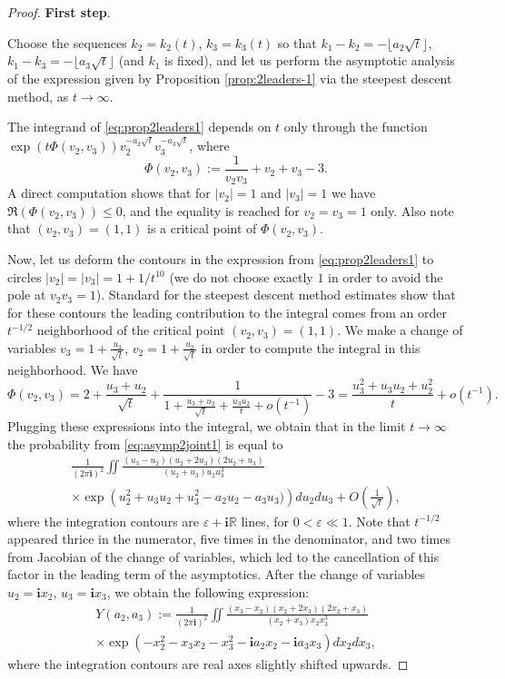 \documentclass[11pt,reqno]{amsart}
\theoremstyle{definition}
\theoremstyle{remark}
\theoremstyle{remark}
\def\leq{\leqslant}
\renewcommand\le{\leq}
\def\R{\mathbb R}
\newcommand{\eps}{\varepsilon}
\newcommand{\ii}{{\mathbf i}}
\numberwithin{equation}{section}
\begin{document}
	\begin{proof}
		
		\textbf{First step}. 
		
		\smallskip
		
		Choose the sequences $k_2 = k_2(t)$, $k_3 = k_3 (t)$ so that $k_1 - k_2 = - \lfloor a_2 \sqrt{t} \rfloor$, $k_1 - k_3 =- \lfloor a_3 \sqrt{t} \rfloor$ (and $k_1$ is fixed), and
		let us perform the asymptotic analysis of the expression given by Proposition \ref{prop:2leaders-1} via the steepest descent method, as $t \to \infty$. 
		
		The integrand of \eqref{eq:prop2leaders1} depends on $t$ only through the function $\exp ( t \Phi (v_2,v_3)) v_2^{-a_2 \sqrt{t}} v_3^{-a_3 \sqrt{t}}$, where
		$$
		\Phi (v_2,v_3) := \frac{1}{v_2 v_3} + v_2 + v_3 - 3.
		$$
		A direct computation shows that for $|v_2|=1$ and $|v_3|=1$ we have $\Re \left( \Phi (v_2,v_3) \right) \le 0$, and the equality is reached for $v_2=v_3=1$ only. Also note that $(v_2,v_3)=(1,1)$ is a critical point of $\Phi (v_2,v_3)$. 
		
		Now, let us deform the contours in the expression from \eqref{eq:prop2leaders1} to circles $|v_2|=|v_3|=1 +1/ t^{10}$ (we do not choose exactly $1$ in order to avoid the pole at $v_2 v_3 =1$). Standard for the steepest descent method estimates show that for these contours the leading contribution to the integral comes from an order $t^{-1/2}$ neighborhood of the critical point $(v_2,v_3)=(1,1)$. 
		We make a change of variables $v_3 = 1+ \frac{u_3}{\sqrt{t}}$, $v_2 = 1+ \frac{u_2}{\sqrt{t}}$ in order to compute the integral in this neighborhood. We have
		$$
		\Phi (v_2,v_3) = 2 + \frac{u_3+u_2}{\sqrt{t}} + \frac{1}{1+\frac{u_3+u_2}{\sqrt{t}} + \frac{u_3 u_2}{t} + o(t^{-1}) } -3 = \frac{u_3^2+u_3 u_2 +u_2^2}{t} + o( t^{-1}).
		$$
		Plugging these expressions into the integral, we obtain that in the limit $t \to \infty$ the probability from \eqref{eq:asymp2joint1} is equal to
		\begin{multline*}
			\frac{1}{(2 \pi \ii)^2} \iint \frac{(u_3-u_2)(u_2 + 2 u_3)(2 u_2 + u_3)}{ (u_2 + u_3) u_2 u_3^3 } \\ \times \exp \left( u_2^2 + u_3 u_2 +u_3^2 - a_2 u_2 - a_3 u_3) \right) d u_2 d u_3 + O \left( \frac{1}{\sqrt{t}} \right),
		\end{multline*}
		where the integration contours are $\eps+ \ii \R$ lines, for $0 < \eps \ll 1$. Note that $t^{-1/2}$ appeared thrice in the numerator, five times in the denominator, and two times from Jacobian of the change of variables, which led to the cancellation of this factor in the leading term of the asymptotics.
		After the change of variables $u_2 = \ii x_2$, $u_3 = \ii x_3$, we obtain the following expression:
		\begin{multline*}
			Y(a_2,a_3) := \frac{1}{(2 \pi \ii)^2} \iint \frac{(x_3-x_2)(x_2 + 2 x_3)(2 x_2 + x_3)}{ (x_2 + x_3) x_2 x_3^3 } \\ \times \exp \left( - x_2^2 - x_3 x_2 - x_3^2 - \ii a_2 x_2 - \ii a_3 x_3 \right) d x_2 d x_3,
		\end{multline*}
		where the integration contours are real axes slightly shifted upwards.
		

\end{proof}
\end{document}
